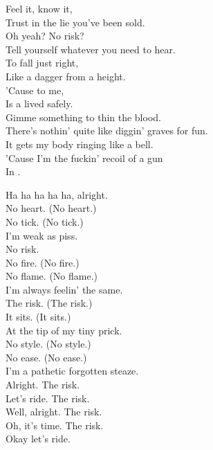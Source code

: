 


Feel it, know it, \\
Trust in the lie you've been sold. \\
Oh yeah? No risk? \\
Tell yourself whatever you need to hear. \\
To fall just right, \\
Like a dagger from a height. \\
'Cause  to me, \\
Is a  lived safely. \\

Gimme something to thin the blood. \\
There's nothin' quite like diggin' graves for fun. \\
It gets my body ringing like a bell. \\
'Cause I'm the fuckin' recoil of a gun \\
In . \\


Ha ha ha ha ha, alright. \\
No heart. (No heart.) \\
No tick. (No tick.) \\
I'm weak as piss. \\
No risk. \\
No fire. (No fire.) \\
No flame. (No flame.) \\
I'm always feelin' the same. \\

The risk. (The risk.) \\
It sits. (It sits.) \\
At the tip of my tiny prick. \\
No style. (No style.) \\
No ease. (No ease.) \\
I'm a pathetic forgotten steaze. \\

Alright. The risk. \\
Let's ride. The risk. \\
Well, alright. The risk. \\
Oh, it's time. The risk. \\
Okay let's ride. \\

